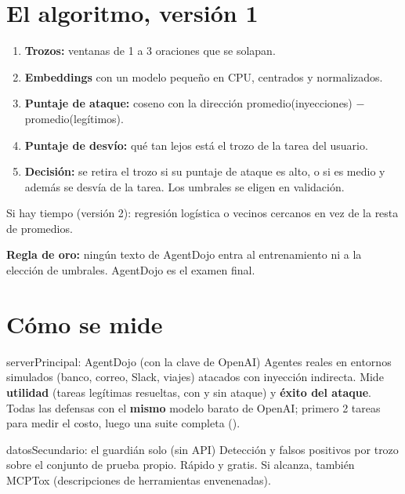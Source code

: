
\section{El algoritmo, versión 1}
\begin{enumerate}
  \item \textbf{Trozos:} ventanas de 1 a 3 oraciones que se solapan.
  \item \textbf{Embeddings} con un modelo pequeño en CPU, centrados y normalizados.
  \item \textbf{Puntaje de ataque:} coseno con la dirección promedio(inyecciones) $-$ promedio(legítimos).
  \item \textbf{Puntaje de desvío:} qué tan lejos está el trozo de la tarea del usuario.
  \item \textbf{Decisión:} se retira el trozo si su puntaje de ataque es alto, o si es medio y además se desvía de la tarea. Los umbrales se eligen en validación.
\end{enumerate}
Si hay tiempo (versión 2): regresión logística o vecinos cercanos en vez de la resta de promedios.

\textbf{Regla de oro:} ningún texto de AgentDojo entra al entrenamiento ni a la elección de umbrales. AgentDojo es el examen final.

\section{Cómo se mide}
\begin{card}{server}{Principal: AgentDojo (con la clave de OpenAI)}
Agentes reales en entornos simulados (banco, correo, Slack, viajes) atacados con inyección indirecta. Mide \textbf{utilidad} (tareas legítimas resueltas, con y sin ataque) y \textbf{éxito del ataque}. Todas las defensas con el \textbf{mismo} modelo barato de OpenAI; primero 2 tareas para medir el costo, luego una suite completa ().
\end{card}
\begin{card}{datos}{Secundario: el guardián solo (sin API)}
Detección y falsos positivos por trozo sobre el conjunto de prueba propio. Rápido y gratis. Si alcanza, también MCPTox (descripciones de herramientas envenenadas).
\end{card}

